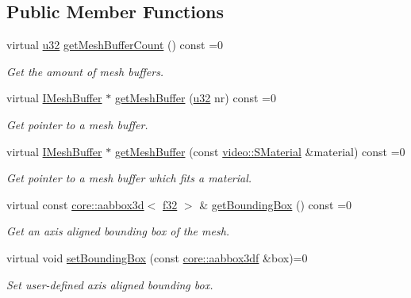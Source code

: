 \subsection*{Public Member Functions}
\begin{DoxyCompactItemize}
\item 
virtual \hyperlink{namespaceirr_a0416a53257075833e7002efd0a18e804}{u32} \hyperlink{classirr_1_1scene_1_1IMesh_a2ebed0bdae2d6537c36b0b7ac831edb8}{get\+Mesh\+Buffer\+Count} () const =0
\begin{DoxyCompactList}\small\item\em Get the amount of mesh buffers. \end{DoxyCompactList}\item 
virtual \hyperlink{classirr_1_1scene_1_1IMeshBuffer}{I\+Mesh\+Buffer} $\ast$ \hyperlink{classirr_1_1scene_1_1IMesh_a2cd1a04b396235101f426befba0c5b82}{get\+Mesh\+Buffer} (\hyperlink{namespaceirr_a0416a53257075833e7002efd0a18e804}{u32} nr) const =0
\begin{DoxyCompactList}\small\item\em Get pointer to a mesh buffer. \end{DoxyCompactList}\item 
virtual \hyperlink{classirr_1_1scene_1_1IMeshBuffer}{I\+Mesh\+Buffer} $\ast$ \hyperlink{classirr_1_1scene_1_1IMesh_a9573dace82efb01ba1f35f9cc28a4ced}{get\+Mesh\+Buffer} (const \hyperlink{classirr_1_1video_1_1SMaterial}{video\+::\+S\+Material} \&material) const =0
\begin{DoxyCompactList}\small\item\em Get pointer to a mesh buffer which fits a material. \end{DoxyCompactList}\item 
virtual const \hyperlink{classirr_1_1core_1_1aabbox3d}{core\+::aabbox3d}$<$ \hyperlink{namespaceirr_a0277be98d67dc26ff93b1a6a1d086b07}{f32} $>$ \& \hyperlink{classirr_1_1scene_1_1IMesh_ada6ecee9cbebed8bb67fd92872552ea0}{get\+Bounding\+Box} () const =0
\begin{DoxyCompactList}\small\item\em Get an axis aligned bounding box of the mesh. \end{DoxyCompactList}\item 
virtual void \hyperlink{classirr_1_1scene_1_1IMesh_a0aee3b5bc5d31ce996becc069f65e642}{set\+Bounding\+Box} (const \hyperlink{namespaceirr_1_1core_a60f4b4c744aba55f10530d503c6ecb04}{core\+::aabbox3df} \&box)=0
\begin{DoxyCompactList}\small\item\em Set user-\/defined axis aligned bounding box. \end{DoxyCompactList}\item 

\end{DoxyCompactItemize}
